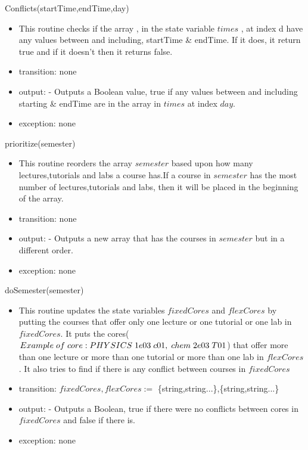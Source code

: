 \documentclass[11pt, oneside]{article}
\begin{document}
\noindent
Conflicts(startTime,endTime,day)
\begin{itemize}
\item This routine checks if the array , in the state variable $times$ ,  at index d have any values between and including, startTime \& endTime. If it does, it return true and if it doesn't then it returns false.
\item transition: none
\item output: - Outputs a Boolean value, true if any values between and including starting \& endTime are in the array in $times$ at index $day$.
 \item exception: none
\end{itemize}

\noindent
prioritize(semester)
\begin{itemize}
\item This routine reorders the array $semester$ based upon how many lectures,tutorials and labs a course has.If a course in $semester$ has the most number of lectures,tutorials and labs, then it will be placed in the beginning of the array.
\item transition: none
\item output: - Outputs a new array that has the courses in $semester$ but in a different order.
 \item exception: none
\end{itemize}
\noindent


doSemester(semester)
\begin{itemize}
\item This routine updates the state variables $fixedCores$ and $flexCores$ by putting the courses that offer only one lecture or one tutorial or one lab in $fixedCores$. It puts the cores($Example\hspace{0.1cm} of \hspace{0.1cm}core: PHYSICS \hspace{0.1cm}1e03\hspace{0.1cm} c01,\hspace{0.1cm} chem\hspace{0.1cm}2e03\hspace{0.1cm} T01 $) that offer more than one lecture or more than one tutorial or more than one lab in $flexCores$. It also tries to find if there is any conflict between courses in $fixedCores$
\item transition: $fixedCores,flexCores :=$ \{string,string...\},\{string,string...\}
\item output: - Outputs a Boolean, true if there were no conflicts between cores in $fixedCores$ and false if there is.
 \item exception: none
\end{itemize}
\end{document}
